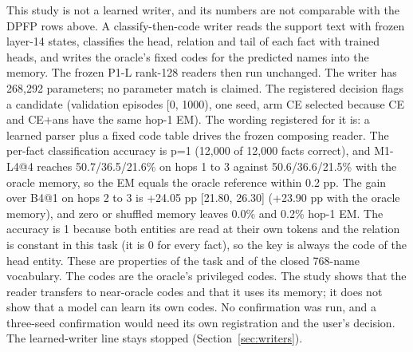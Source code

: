 This study is not a learned writer, and its numbers are not comparable with the DPFP rows above.
A classify-then-code writer reads the support text with frozen layer-14 states, classifies the head, relation and tail of each fact with trained heads, and writes the oracle's fixed codes for the predicted names into the memory.
The frozen P1-L rank-128 readers then run unchanged.
The writer has 268,292 parameters; no parameter match is claimed.  %
The registered decision flags a candidate (validation episodes [0, 1000), one seed, arm CE selected because CE and CE+ans have the same hop-1 EM).
The wording registered for it is: a learned parser plus a fixed code table drives the frozen composing reader.  %
The per-fact classification accuracy is p=1 (12,000 of 12,000 facts correct), and M1-L4@4 reaches 50.7/36.5/21.6\% on hops 1 to 3 against 50.6/36.6/21.5\% with the oracle memory, so the EM equals the oracle reference within 0.2 pp.
The gain over B4@1 on hops 2 to 3 is +24.05 pp [21.80, 26.30] (+23.90 pp with the oracle memory), and zero or shuffled memory leaves 0.0\% and 0.2\% hop-1 EM.  %
The accuracy is 1 because both entities are read at their own tokens and the relation is constant in this task (it is 0 for every fact), so the key is always the code of the head entity.
These are properties of the task and of the closed 768-name vocabulary.  %
The codes are the oracle's privileged codes.
The study shows that the reader transfers to near-oracle codes and that it uses its memory; it does not show that a model can learn its own codes.  %
No confirmation was run, and a three-seed confirmation would need its own registration and the user's decision.
The learned-writer line stays stopped (Section~\ref{sec:writers}).  %
